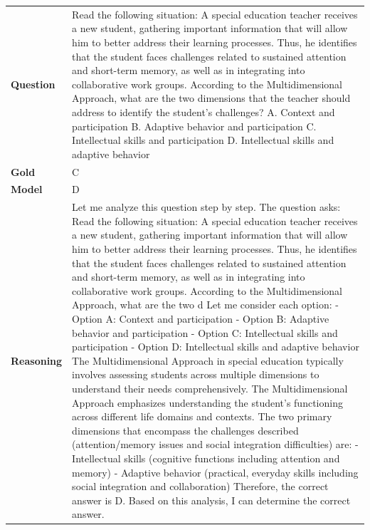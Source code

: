 \begin{longtable}{@{}l p{13cm}@{}}
  \textbf{Question}  & Read the following situation: A special education teacher receives a new student, gathering important information that will allow him to better address their learning processes. Thus, he identifies that the student faces challenges related to sustained attention and short-term memory, as well as in integrating into collaborative work groups. According to the Multidimensional Approach, what are the two dimensions that the teacher should address to identify the student's challenges? \newline A. Context and participation \newline B. Adaptive behavior and participation \newline C. Intellectual skills and participation \newline D. Intellectual skills and adaptive behavior   \\
  \textbf{Gold}      & C       \\
  \textbf{Model}     & D  \\
  \textbf{Reasoning} & Let me analyze this question step by step. \newline The question asks: Read the following situation: A special education teacher receives a new student, gathering important information that will allow him to better address their learning processes. Thus, he identifies that the student faces challenges related to sustained attention and short-term memory, as well as in integrating into collaborative work groups. According to the Multidimensional Approach, what are the two d \newline Let me consider each option: \newline - Option A: Context and participation \newline - Option B: Adaptive behavior and participation \newline - Option C: Intellectual skills and participation \newline - Option D: Intellectual skills and adaptive behavior \newline The Multidimensional Approach in special education typically involves assessing students across multiple dimensions to understand their needs comprehensively. The Multidimensional Approach emphasizes understanding the student's functioning across different life domains and contexts. The two primary dimensions that encompass the challenges described (attention/memory issues and social integration difficulties) are: \newline - Intellectual skills (cognitive functions including attention and memory) \newline - Adaptive behavior (practical, everyday skills including social integration and collaboration) \newline Therefore, the correct answer is D. \newline Based on this analysis, I can determine the correct answer.  \\

\end{longtable}
